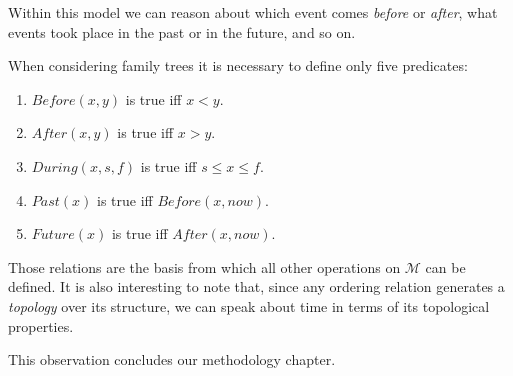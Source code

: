     Within this model we can reason about which event comes \textit{before} or \textit{after}, what events took place in the past or
    in the future, and so on.

    When considering family trees it is necessary to define only five predicates:
    \begin{enumerate}
        \item{$Before(x, y)$ is true iff $x < y$.}
        \item{$After(x, y)$ is true iff $x > y$.}
        \item{$During(x, s, f)$ is true iff $s \leqslant x \leqslant f$.}
        \item{$Past(x)$ is true iff $Before(x, now)$.}
        \item{$Future(x)$ is true iff $After(x, now)$.}
    \end{enumerate}
    Those relations are the basis from which all other operations on $\mathcal{M}$ can be defined. It is also interesting to note
    that, since any ordering relation generates a \textit{topology} over its structure, we can speak about time in terms of its
    topological properties.

    This observation concludes our methodology chapter.
